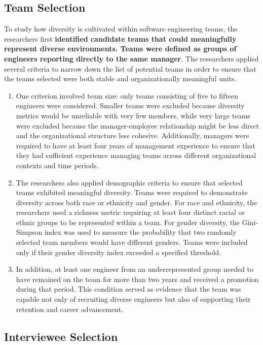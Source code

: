 \subsection{Team Selection}

To study how diversity is cultivated within software engineering teams, the researchers first \textbf{identified candidate teams that could meaningfully represent diverse environments. Teams were defined as groups of engineers reporting directly to the same manager}. The researchers applied several criteria to narrow down the list of potential teams in order to ensure that the teams selected were both stable and organizationally meaningful units.
\begin{enumerate}
    \item One criterion involved team size: only teams consisting of five to fifteen engineers were considered. Smaller teams were excluded because diversity metrics would be unreliable with very few members, while very large teams were excluded because the manager-employee relationship might be less direct and the organizational structure less cohesive. Additionally, managers were required to have at least four years of management experience to ensure that they had sufficient experience managing teams across different organizational contexts and time periods.
    \item The researchers also applied demographic criteria to ensure that selected teams exhibited meaningful diversity. Teams were required to demonstrate diversity across both race or ethnicity and gender. For race and ethnicity, the researchers used a richness metric requiring at least four distinct racial or ethnic groups to be represented within a team. For gender diversity, the Gini-Simpson index was used to measure the probability that two randomly selected team members would have different genders. Teams were included only if their gender diversity index exceeded a specified threshold.
    \item In addition, at least one engineer from an underrepresented group needed to have remained on the team for more than two years and received a promotion during that period. This condition served as evidence that the team was capable not only of recruiting diverse engineers but also of supporting their retention and career advancement.
\end{enumerate}

\subsection{Interviewee Selection}

